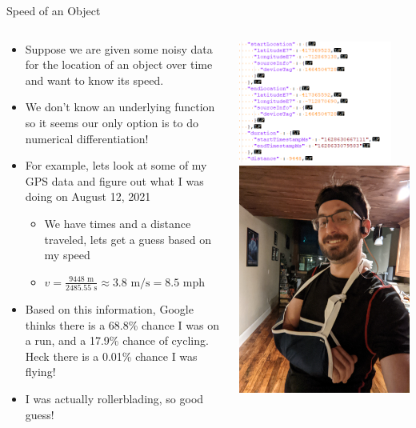 {}\documentclass[letterpaper,
compress,
xcolor=x11names,
]{beamer}
\begin{document}
\begin{frame}{Speed of an Object}
	\footnotesize
	\begin{columns}
		\begin{column}{0.65\linewidth}
			\begin{itemize}
				\item Suppose we are given some noisy data for the location of an object over time and want to know its speed.
				\item We don't know an underlying function so it seems our only option is to do numerical differentiation!
				\item For example, lets look at some of my GPS data and figure out what I was doing on August 12, 2021
				\begin{itemize}
					\item We have times and a distance traveled, lets get a guess based on my speed
					\item $ v = \frac{9448\text{ m}}{2485.55\text{ s}} \approx 3.8\text{ m/s} = 8.5\text{ mph}$
				\end{itemize}
			\item Based on this information, Google thinks there is a 68.8\% chance I was on a run, and a 17.9\% chance of cycling. Heck there is a 0.01\% chance I was flying!
			\item I was actually rollerblading, so good guess!
			\end{itemize}
		\end{column}
		\begin{column}{0.35\linewidth}
			\begin{center}
				\includegraphics[height = 4cm]{gps_data.png}\\
				\includegraphics[angle = 90, width = 0.6\linewidth]{Broken_Chris.jpg}\\

\end{center}
\end{column}
\end{columns}
\end{frame}
\end{document}
